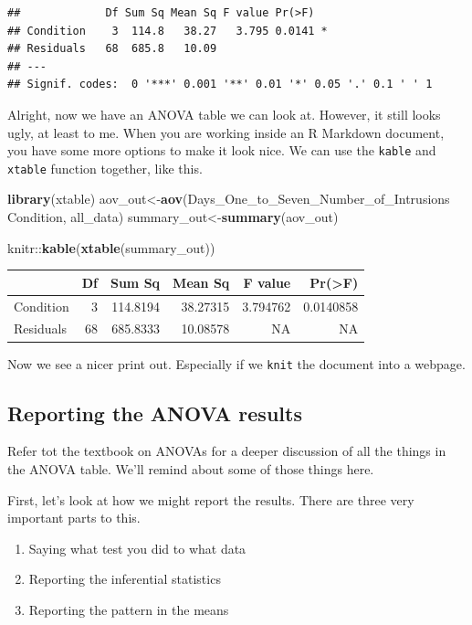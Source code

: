 \documentclass[]{book}
\newenvironment{Shaded}{\begin{snugshade}}{\end{snugshade}}
\newcommand{\KeywordTok}[1]{\textcolor[rgb]{0.13,0.29,0.53}{\textbf{{#1}}}}
\newcommand{\StringTok}[1]{\textcolor[rgb]{0.31,0.60,0.02}{{#1}}}
\newcommand{\NormalTok}[1]{{#1}}
\providecommand{\tightlist}{%
  \setlength{\itemsep}{0pt}\setlength{\parskip}{0pt}}
\theoremstyle{definition}
\theoremstyle{definition}
\theoremstyle{definition}
\theoremstyle{remark}
\begin{document}
\begin{verbatim}
##             Df Sum Sq Mean Sq F value Pr(>F)  
## Condition    3  114.8   38.27   3.795 0.0141 *
## Residuals   68  685.8   10.09                 
## ---
## Signif. codes:  0 '***' 0.001 '**' 0.01 '*' 0.05 '.' 0.1 ' ' 1
\end{verbatim}

Alright, now we have an ANOVA table we can look at. However, it still
looks ugly, at least to me. When you are working inside an R Markdown
document, you have some more options to make it look nice. We can use
the \texttt{kable} and \texttt{xtable} function together, like this.

\begin{Shaded}
\begin{Highlighting}[]
\KeywordTok{library}\NormalTok{(xtable)}
\NormalTok{aov_out<-}\KeywordTok{aov}\NormalTok{(Days_One_to_Seven_Number_of_Intrusions ~}\StringTok{ }\NormalTok{Condition, all_data)}
\NormalTok{summary_out<-}\KeywordTok{summary}\NormalTok{(aov_out)}

\NormalTok{knitr::}\KeywordTok{kable}\NormalTok{(}\KeywordTok{xtable}\NormalTok{(summary_out))}
\end{Highlighting}
\end{Shaded}

\begin{tabular}{l|r|r|r|r|r}
\hline
  & Df & Sum Sq & Mean Sq & F value & Pr(>F)\\
\hline
Condition & 3 & 114.8194 & 38.27315 & 3.794762 & 0.0140858\\
\hline
Residuals & 68 & 685.8333 & 10.08578 & NA & NA\\
\hline
\end{tabular}

Now we see a nicer print out. Especially if we \texttt{knit} the
document into a webpage.

\subsection{Reporting the ANOVA
results}\label{reporting-the-anova-results}

Refer tot the textbook on ANOVAs for a deeper discussion of all the
things in the ANOVA table. We'll remind about some of those things here.

First, let's look at how we might report the results. There are three
very important parts to this.

\begin{enumerate}
\def\labelenumi{\arabic{enumi}.}
\tightlist
\item
  Saying what test you did to what data
\item
  Reporting the inferential statistics
\item
  Reporting the pattern in the means
\end{enumerate}
\end{document}
